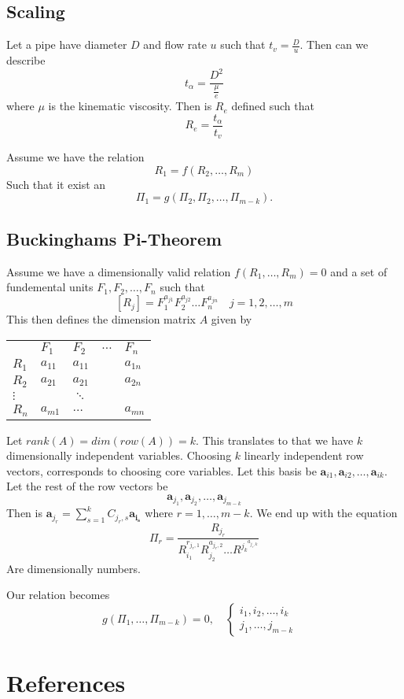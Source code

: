 \documentclass{article}
\theoremstyle{remark}
\begin{document}
\subsection{Scaling}%
\label{sub:scaling}

Let a pipe have diameter $D$ and flow rate $u$ such that $ t_{v} = \frac{D}{ u} $. Then can we describe \[
t_{\alpha } =  \frac{D^{2}}{ \frac{ \mu }{e} } 
\] 
where $\mu $ is the kinematic viscosity. Then is $R_{e} $ defined such that \[
R_{e} = \frac{t_{\alpha }}{ t_{v}} 
\]
\par
Assume we have the relation \[
R_{1} = f\left( R_{2}, \ldots, R_{m} \right)
\] 
Such that it exist an \[
\Pi _{1} = g\left( \Pi _{2}, \Pi _{2} , \ldots, \Pi _{m-k}  \right).
\] 
\subsection{Buckinghams Pi-Theorem}%
\label{sub:buckinghams_pi_theorem}

Assume we have a dimensionally valid relation $f\left( R_{1}, \ldots, R_{m} \right) = 0$ and a set of fundemental units $F_{1}, F_{2}, \ldots, F_{n}$ such that \[
\left[ R_{j} \right] = F_{1} ^{a_{j1}} F_{2} ^{a_{j2}} \ldots F_{n}^{a_{jn} } \quad  j = 1,2, \ldots, m 
\] 
This then defines the dimension matrix $A$ given by 
\begin{table}[]
\begin{tabular}{lllll}
 &  $F_{1}$ & $F_{2}$ & $\ldots$  & $F_{n}$  \\
$R_1$ &$a_{11}$  &$a_{11}$  &     & $a_{1n}$ &  \\
$R_2$ &$a_{21}$  &$a_{21}$  &     &  $a_{2n}$ &  \\
$\vdots$  &  & $\ddots$  &  &  \\
$R_n$ &  $a_{m1}$ & $\ldots$   &  &  $a_{mn}$&
\end{tabular}
\end{table}

Let $rank\left( A \right) = dim \left( row\left( A \right) \right) = k$. This translates to that we have $k$ dimensionally  independent variables. Choosing $k$ linearly independent row vectors, corresponds to choosing core variables. Let this basis be $\mathbf{a}_{i1}, \mathbf{a}_{i2}, \ldots , \mathbf{a}_{ik}$. Let the rest of the row vectors be \[
\mathbf{a}_{j_{1}} , \mathbf{a}_{j_{2}}, \ldots, \mathbf{a}_{j_{m-k}}
\] 
Then is $\mathbf{a}_{j_{r}} =  \sum_{s=1}^{k} C _{j_{r}, s} \mathbf{a_{i_{s}}}  $ where $r=  1, \ldots, m-k$. We end up with the equation \[
  \Pi _{r} = \frac{R_{j_{r}}}{ R_{i_{1}} ^{ r_{j_{r}, 1}} R_{j_{2}}^{a_{j_{r}, 2}} \ldots R^{j_{k}} ^{ a_{j_{r}, k}} } 
\] 
Are dimensionally numbers. \par Our relation becomes \[
g\left( \Pi _{1} , \ldots, \Pi _{m-k} \right) = 0, \quad \begin{cases}
  i_{1}, i_{2} , \ldots, i_{k}  &  \\
  j_{1} , \ldots, j_{m-k}
\end{cases} 
\] 




\newpage
\section{References}%
\label{sec:references}


  


\end{document}
